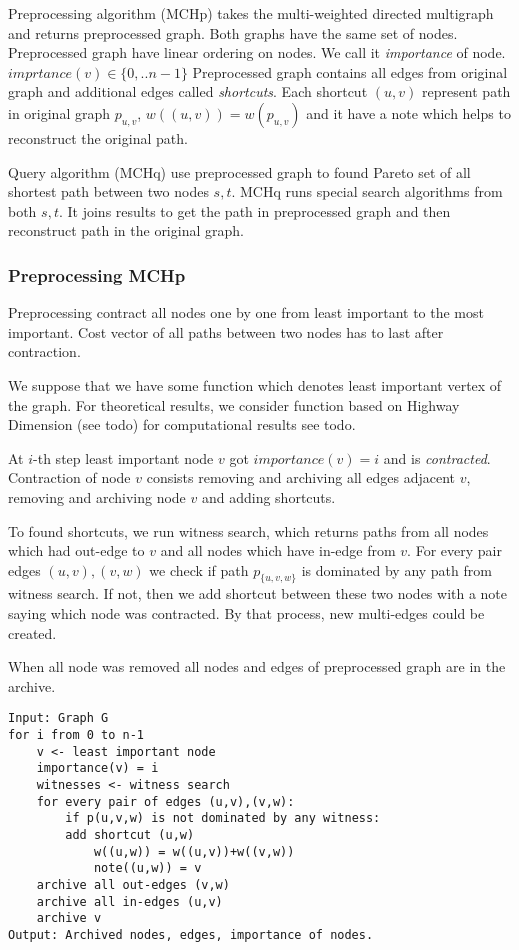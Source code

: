 Preprocessing algorithm (MCHp) takes the multi-weighted directed multigraph
and returns preprocessed graph. Both graphs have the same set of nodes.
Preprocessed graph have linear ordering on nodes. We call it \emph{importance} of
node. $imprtance(v) \in \{0,..n-1\}$ 
Preprocessed graph contains all edges from original graph
and additional edges called \emph{shortcuts}. Each shortcut $(u,v)$ represent 
path in original graph $p_{u,v}$, $w((u,v)) = w(p_{u,v})$ and it have a note which helps
to reconstruct the original path.

Query algorithm (MCHq) use preprocessed graph to found Pareto set of all
shortest path between two nodes $s, t$. MCHq runs special search algorithms
from both $s, t$. It joins results to get the path in preprocessed graph and then reconstruct path in the original graph.

\subsubsection{Preprocessing MCHp}

Preprocessing contract all nodes one by one from least important to the most important. 
Cost vector of all paths between two nodes has to last after contraction.

We suppose that we have some function which denotes least important vertex of the graph. For theoretical results, we consider function based on Highway Dimension
(see todo)  for computational results see todo.

At $i$-th step least important node $v$ got $importance(v) = i$ and is \emph{contracted}. 
Contraction of node $v$ consists removing and archiving all edges adjacent $v$, removing 
and archiving node $v$ and adding shortcuts. 

To found shortcuts, we run witness search, which returns paths from all nodes which had
out-edge to $v$ and all nodes which have in-edge from $v$. 
For every pair edges $(u,v),(v,w)$ we check 
if path $p_{\{u,v,w\}}$ is dominated by any path from witness search. 
If not, then we add shortcut between these two nodes with a note 
saying which node was contracted.
By that process, new multi-edges could be created.

When all node was removed all nodes and edges of preprocessed graph are in the archive.

\begin{lstlisting}[caption={MCHp},label=list:8-6,captionpos=t,float,abovecaptionskip=-\medskipamount]
Input: Graph G
for i from 0 to n-1
    v <- least important node
    importance(v) = i
    witnesses <- witness search
    for every pair of edges (u,v),(v,w):
        if p(u,v,w) is not dominated by any witness:
        add shortcut (u,w)
            w((u,w)) = w((u,v))+w((v,w))
            note((u,w)) = v
    archive all out-edges (v,w) 
    archive all in-edges (u,v)
    archive v
Output: Archived nodes, edges, importance of nodes.
\end{lstlisting}


